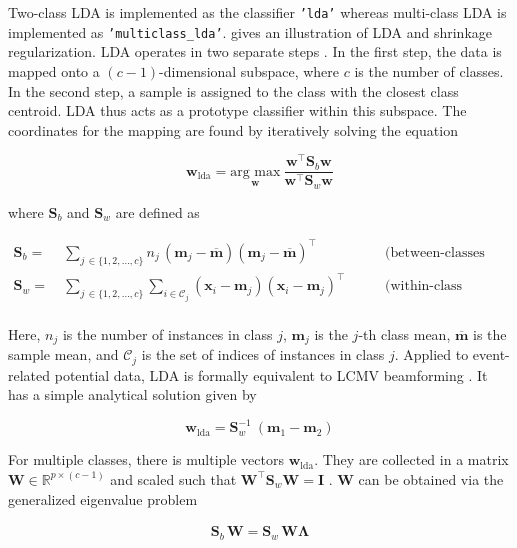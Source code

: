 \documentclass[utf8]{frontiersSCNS} %
\newcommand{\m}{\mathbf{m}}
\newcommand{\mbar}{\overline{\m}}
\newcommand{\mm}[1]{\m_{#1}}
\newcommand{\w}{\mathbf{w}}
\newcommand{\x}{\mathbf{x}}
\newcommand{\I}{\mathbf{I}}
\newcommand{\R}{\mathbb{R}}
\renewcommand{\S}{\mathbf{S}}
\newcommand{\W}{\mathbf{W}}
\newcommand{\ttt}[1]{\texttt{#1}}
\begin{document}
Two-class LDA is implemented as the classifier \ttt{'lda'} whereas multi-class LDA is implemented as \texttt{'multiclass\_lda'}.  gives an illustration of LDA and shrinkage regularization. LDA operates in two separate steps \citep{Fisher1936}. In the first step, the data is mapped onto a $(c-1)$-dimensional subspace, where $c$ is the number of classes. In the second step, a sample is assigned to the class with the closest class centroid. LDA thus acts as a prototype classifier within this subspace. The coordinates for the mapping are found by iteratively solving the equation

\begin{equation}
\label{eq:fda}
\w_{\text{lda}} = \underset{\w}{\text{arg max}}\ \frac{\w^\top \S_b\w}{\w^\top \S_w\w}
\end{equation}

where $\S_b$ and $\S_w$ are defined as

\begin{equation*}
\begin{alignedat}{2}
\S_b =\ & \sum_{j\,\in\{1,2,...,c\}}n_j\,(\mm{j} -\mbar) (\mm{j} - \mbar)^\top\ \quad &&\text{(between-classes scatter)}\\
\S_w =\ & \sum_{j\,\in\{1,2,...,c\}}\sum_{i\in\mathcal{C}_j} (\x_i - \mm{j})(\x_i - \mm{j})^\top\  \quad &&\text{(within-class scatter)}\\
\end{alignedat}
\end{equation*}

Here, $n_j$ is the number of instances in class $j$, $\m_j$ is the $j$-th class mean, $\mbar$ is the sample mean, and $\mathcal{C}_j$ is the set of indices of instances in class $j$. Applied to event-related potential data, LDA is  formally equivalent to LCMV beamforming \citep{Treder2016}. It has a simple analytical solution given by

\begin{equation}
\label{eq:lda_solution}
\w_{\text{lda}} = \S_w^{-1}\ (\m_1 - \m_2)
\end{equation}

For multiple classes, there is multiple vectors $\w_{\text{lda}}$. They are collected in a matrix $\W\in\R^{p\times(c-1)}$ and scaled such that $\W^\top\S_w\W = \I$ \citep{Bishop2007}. $\W$ can be obtained via the generalized eigenvalue problem

\begin{align}
\label{eq:LDA-eigenvalue-multiclass}
\S_b\,\W = \S_w\,\W\mathbf{\Lambda}
\end{align}
\end{document}
